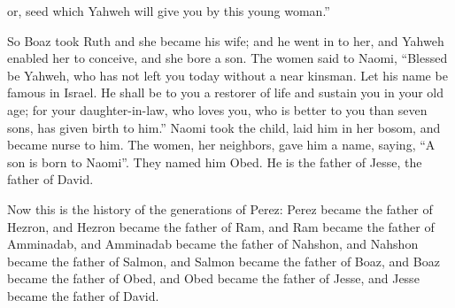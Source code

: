 {{or, seed} which Yahweh will give you by this young woman.”
\par }{\PP {}So Boaz took Ruth and she became his wife; and he went in to her, and Yahweh enabled her to conceive, and she bore a son.
The women said to Naomi, “Blessed be Yahweh, who has not left you today without a near kinsman. Let his name be famous in Israel.
He shall be to you a restorer of life and sustain you in your old age; for your daughter-in-law, who loves you, who is better to you than seven sons, has given birth to him.”
Naomi took the child, laid him in her bosom, and became nurse to him.
The women, her neighbors, gave him a name, saying, “A son is born to Naomi”. They named him Obed. He is the father of Jesse, the father of David.
\par }{\PP {}Now this is the history of the generations of Perez: Perez became the father of Hezron,
and Hezron became the father of Ram, and Ram became the father of Amminadab,
and Amminadab became the father of Nahshon, and Nahshon became the father of Salmon,
and Salmon became the father of Boaz, and Boaz became the father of Obed,
and Obed became the father of Jesse, and Jesse became the father of David.
\par }